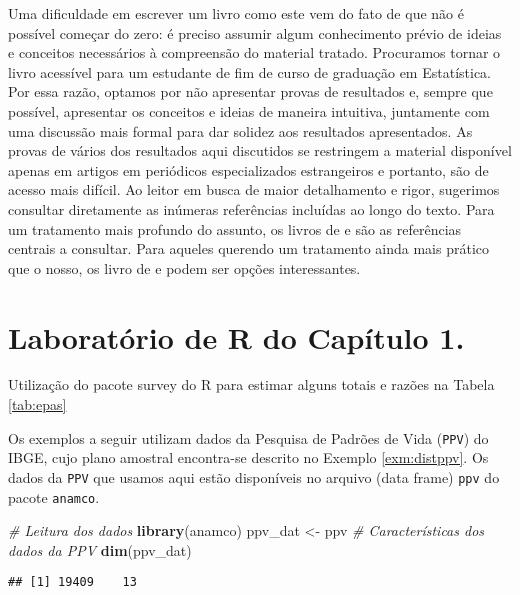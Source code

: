 \documentclass[]{book}
\newenvironment{Shaded}{\begin{snugshade}}{\end{snugshade}}
\newcommand{\KeywordTok}[1]{\textcolor[rgb]{0.13,0.29,0.53}{\textbf{#1}}}
\newcommand{\StringTok}[1]{\textcolor[rgb]{0.31,0.60,0.02}{#1}}
\newcommand{\CommentTok}[1]{\textcolor[rgb]{0.56,0.35,0.01}{\textit{#1}}}
\newcommand{\NormalTok}[1]{#1}
\theoremstyle{definition}
\theoremstyle{definition}
\theoremstyle{definition}
\theoremstyle{remark}
\let\BeginKnitrBlock\begin \let\EndKnitrBlock\end
\begin{document}
Uma dificuldade em escrever um livro como este vem do fato de que não é
possível começar do zero: é preciso assumir algum conhecimento prévio de
ideias e conceitos necessários à compreensão do material tratado.
Procuramos tornar o livro acessível para um estudante de fim de curso de
graduação em Estatística. Por essa razão, optamos por não apresentar
provas de resultados e, sempre que possível, apresentar os conceitos e
ideias de maneira intuitiva, juntamente com uma discussão mais formal
para dar solidez aos resultados apresentados. As provas de vários dos
resultados aqui discutidos se restringem a material disponível apenas em
artigos em periódicos especializados estrangeiros e portanto, são de
acesso mais difícil. Ao leitor em busca de maior detalhamento e rigor,
sugerimos consultar diretamente as inúmeras referências incluídas ao
longo do texto. Para um tratamento mais profundo do assunto, os livros
de \citep{SHS89} e \citep{CHSK2003} são as referências centrais a
consultar. Para aqueles querendo um tratamento ainda mais prático que o
nosso, os livro de \citep{lethonen} e \citep{heeringa} podem ser opções
interessantes.

\section{Laboratório de R do Capítulo 1.}\label{epa}

\BeginKnitrBlock{example}
\protect\hypertarget{exm:exe12}{}{\label{exm:exe12} }Utilização do pacote
survey do R para estimar alguns totais e razões na Tabela \ref{tab:epas}
\EndKnitrBlock{example} Os exemplos a seguir utilizam dados da Pesquisa
de Padrões de Vida (\texttt{PPV}) do IBGE, cujo plano amostral
encontra-se descrito no Exemplo \ref{exm:distppv}. Os dados da
\texttt{PPV} que usamos aqui estão disponíveis no arquivo (data frame)
\texttt{ppv} do pacote \texttt{anamco}.

\begin{Shaded}
\begin{Highlighting}[]
\CommentTok{# Leitura dos dados}
\KeywordTok{library}\NormalTok{(anamco)}
\NormalTok{ppv_dat <-}\StringTok{ }\NormalTok{ppv}
\CommentTok{# Características dos dados da PPV}
\KeywordTok{dim}\NormalTok{(ppv_dat)}
\end{Highlighting}
\end{Shaded}

\begin{verbatim}
## [1] 19409    13
\end{verbatim}
\end{document}
